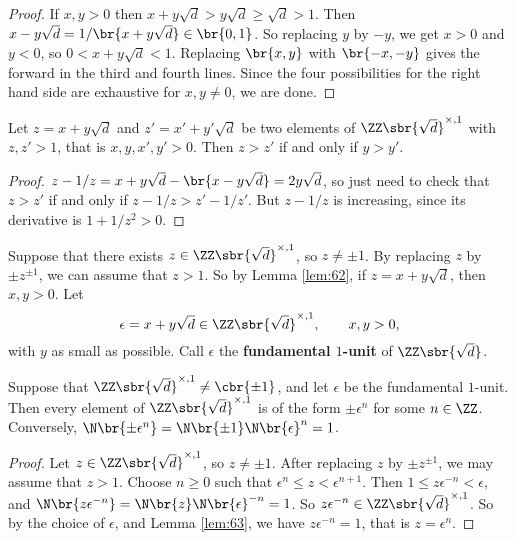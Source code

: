 \begin{proof}
If $ x, y > 0 $ then $ x + y\sqrt{d} > y\sqrt{d} \ge \sqrt{d} > 1 $. Then $ x - y\sqrt{d} = 1 / \br{x + y\sqrt{d}} \in \br{0, 1} $. So replacing $ y $ by $ -y $, we get $ x > 0 $ and $ y < 0 $, so $ 0 < x + y\sqrt{d} < 1 $. Replacing $ \br{x, y} $ with $ \br{-x, -y} $ gives the forward in the third and fourth lines. Since the four possibilities for the right hand side are exhaustive for $ x, y \ne 0 $, we are done.
\end{proof}

\pagebreak

\begin{lemma}
\label{lem:63}
Let $ z = x + y\sqrt{d} $ and $ z' = x' + y'\sqrt{d} $ be two elements of $ \ZZ\sbr{\sqrt{d}}^{\times, 1} $ with $ z, z' > 1 $, that is $ x, y, x', y' > 0 $. Then $ z > z' $ if and only if $ y > y' $.
\end{lemma}

\begin{proof}
$ z - 1 / z = x + y\sqrt{d} - \br{x - y\sqrt{d}} = 2y\sqrt{d} $, so just need to check that $ z > z' $ if and only if $ z - 1 / z > z' - 1 / z' $. But $ z - 1 / z $ is increasing, since its derivative is $ 1 + 1 / z^2 > 0 $.
\end{proof}


Suppose that there exists $ z \in \ZZ\sbr{\sqrt{d}}^{\times, 1} $, so $ z \ne \pm 1 $. By replacing $ z $ by $ \pm z^{\pm 1} $, we can assume that $ z > 1 $. So by Lemma \ref{lem:62}, if $ z = x + y\sqrt{d} $, then $ x, y > 0 $. Let
$$ \epsilon = x + y\sqrt{d} \in \ZZ\sbr{\sqrt{d}}^{\times, 1}, \qquad x, y > 0, $$
with $ y $ as small as possible. Call $ \epsilon $ the \textbf{fundamental $ 1 $-unit} of $ \ZZ\sbr{\sqrt{d}} $.

\begin{proposition}
Suppose that $ \ZZ\sbr{\sqrt{d}}^{\times, 1} \ne \cbr{\pm 1} $, and let $ \epsilon $ be the fundamental $ 1 $-unit. Then every element of $ \ZZ\sbr{\sqrt{d}}^{\times, 1} $ is of the form $ \pm\epsilon^n $ for some $ n \in \ZZ $. Conversely, $ \N\br{\pm\epsilon^n} = \N\br{\pm 1}\N\br{\epsilon}^n = 1 $.
\end{proposition}

\begin{proof}
Let $ z \in \ZZ\sbr{\sqrt{d}}^{\times, 1} $, so $ z \ne \pm 1 $. After replacing $ z $ by $ \pm z^{\pm 1} $, we may assume that $ z > 1 $. Choose $ n \ge 0 $ such that $ \epsilon^n \le z < \epsilon^{n + 1} $. Then $ 1 \le z\epsilon^{-n} < \epsilon $, and $ \N\br{z\epsilon^{-n}} = \N\br{z}\N\br{\epsilon}^{-n} = 1 $. So $ z\epsilon^{-n} \in \ZZ\sbr{\sqrt{d}}^{\times, 1} $. So by the choice of $ \epsilon $, and Lemma \ref{lem:63}, we have $ z\epsilon^{-n} = 1 $, that is $ z = \epsilon^n $.
\end{proof}

